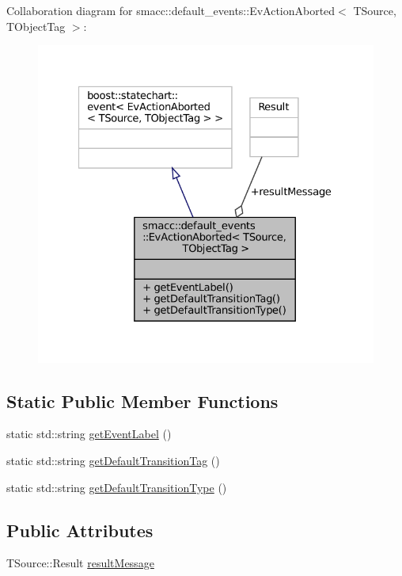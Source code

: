 Collaboration diagram for smacc\+:\+:default\+\_\+events\+:\+:Ev\+Action\+Aborted$<$ T\+Source, T\+Object\+Tag $>$\+:
\nopagebreak
\begin{figure}[H]
\begin{center}
\leavevmode
\includegraphics[width=327pt]{structsmacc_1_1default__events_1_1EvActionAborted__coll__graph}
\end{center}
\end{figure}
\subsection*{Static Public Member Functions}
\begin{DoxyCompactItemize}
\item 
static std\+::string \hyperlink{structsmacc_1_1default__events_1_1EvActionAborted_ae3613f85ce29214e061ea2677a4d28e1}{get\+Event\+Label} ()
\item 
static std\+::string \hyperlink{structsmacc_1_1default__events_1_1EvActionAborted_ad31e4437f0d30bf59589c28590a1edaa}{get\+Default\+Transition\+Tag} ()
\item 
static std\+::string \hyperlink{structsmacc_1_1default__events_1_1EvActionAborted_abb8137180081b5cce72398b81cc95fc5}{get\+Default\+Transition\+Type} ()
\end{DoxyCompactItemize}
\subsection*{Public Attributes}
\begin{DoxyCompactItemize}
\item 
T\+Source\+::\+Result \hyperlink{structsmacc_1_1default__events_1_1EvActionAborted_a0cd103e20d922ab5039022b67fffd5f7}{result\+Message}
\end{DoxyCompactItemize}


